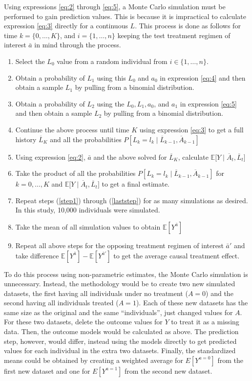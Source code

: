 \begin{enumerate}
Using expressions \ref{eq:2} through \ref{eq:5}, a Monte Carlo simulation must be performed to gain prediction values.  This is because it is impractical to calculate expression \ref{eq:3} directly for a continuous $L$.  This process is done as follows for time $k = \{ 0, \dots, K \}$, and $i = \{ 1, \dots, n \}$ keeping the test treatment regimen of interest $\bar{a}$ in mind through the process.  
\begin{enumerate} 
\item Select the $L_0$ value from a random individual from $i \in  \{ 1, \dots, n \}$. \label{step1}  
\item Obtain a probability of $L_1$ using this $L_0$ and $a_0$ in expression \ref{eq:4} and then obtain a sample $L_1$ by pulling from a binomial distribution.  
\item Obtain a probability of $L_2$ using the $L_0, L_1, a_0$, and $a_1$ in expression \ref{eq:5} and then obtain a sample $L_2$ by pulling from a binomial distribution.  
\item Continue the above process until time $K$ using expression \ref{eq:3} to get a full history $\overline{L}_K$ and all the probabilities $P[L_k = l_k \mid  \overline{L}_{k-1}, \overline{A}_{k-1}]$ 
\item Using expression \ref{eq:2}, $\bar{a}$ and the above solved for $\overline{L}_K$, calculate $\mathbb{E} \big[Y \mid \overline{A}_t, \overline{L}_t \big]$ 
\item Take the product of all the probabilities $P[L_k = l_k \mid  \overline{L}_{k-1}, \overline{A}_{k-1}]$ for $k = 0, \dots, K$ and $\mathbb{E} \big[Y \mid \overline{A}_t, \overline{L}_t \big]$ to get a final estimate.  \label{laststep}
\item Repeat steps (\ref{step1}) through (\ref{laststep}) for as many simulations as desired.  In this study, 10,000 individuals were simulated.    
\item Take the mean of all simulation values to obtain $\mathbb{E}[Y^{\bar{a}}]$ 
\item Repeat all above steps for the opposing treatment regimen of interest $\bar{a}'$ and take difference $\mathbb{E}[Y^{\bar{a}}] - \mathbb{E}[Y^{\bar{a}'}]$ to get the average causal treatment effect.  
\end{enumerate}
\end{enumerate} 

To do this process using non-parametric estimates, the Monte Carlo simulation is unnecessary.  Instead, the methodology would be to create two new simulated datasets, the first having all individuals under no treatment ($A=0$) and the second having all individuals treated ($A=1$).  Each of these new datasets has the same size as the original and the same ``individuals'', just changed values for $A$.  For these two datasets, delete the outcome values for $Y$ to treat it as a missing data.  Then, the outcome models would be calculated as above.  The prediction step, however, would differ, instead using the models directly to get predicted values for each individual in the extra two datasets.  Finally, the standardized means could be obtained by creating a weighted average for $E[Y^{a=0}]$ from the first new dataset and one for $E[Y^{a=1}]$ from the second new dataset.  



